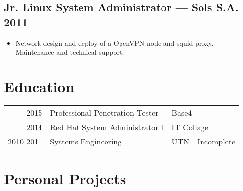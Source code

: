 \documentclass[11pt]{article}
\begin{document}
\subsection{Jr. Linux System Administrator --- Sols S.A. \hfill 2011}
\begin{itemize}
  \setlength{\parskip}{0pt}
  \setlength{\itemsep}{0pt plus 1pt}
\item Network design and deploy of a OpenVPN node and squid proxy. Maintenance and technical support.
\end{itemize}


\section{Education}


\begin{center}
\begin{tabular}{@{}r|p{}|l}
  \hspace{.1em} 2015      & Professional Penetration Tester & {Base4} \\
  \hspace{.1em} 2014      & Red Hat System Administrator I  & {IT Collage} \\
  \hspace{.1em} 2010-2011 & Systems Engineering             & {UTN - Incomplete}
\end{tabular}
\end{center}


\section{Personal Projects}
\end{document}

